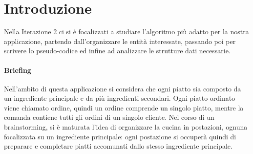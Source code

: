 \section{Introduzione}
Nella Iterazione 2 ci si è focalizzati a studiare l'algoritmo più adatto per la nostra applicazione, partendo dall'organizzare le entità interessate, passando poi per scrivere lo pseudo-codice ed infine ad analizzare le strutture dati necessarie.

\paragraph{Briefing} Nell'ambito di questa applicazione si considera che ogni piatto sia composto da un ingrediente principale e da più ingredienti secondari.
Ogni piatto ordinato viene chiamato ordine, quindi un ordine comprende un singolo piatto, mentre la comanda contiene tutti gli ordini di un singolo cliente.
Nel corso di un brainstorming, si è maturata l’idea di organizzare la cucina in postazioni, ognuna focalizzata su un ingrediente principale: ogni postazione si occuperà quindi di preparare e completare piatti accomunati dallo stesso ingrediente principale.
\clearpage